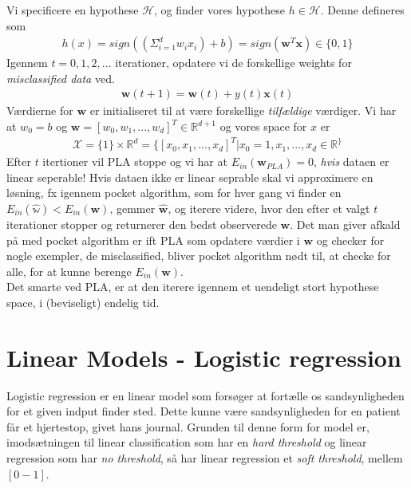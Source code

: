 \documentclass[paper=a4, fontsize=11pt]{scrartcl} %
\numberwithin{equation}{section} %
\numberwithin{figure}{section} %
\numberwithin{table}{section} %
\begin{document}
	Vi specificere en hypothese $\mathcal{H}$, og finder vores hypothese $h\in\mathcal{H}$. Denne defineres som
	\begin{align*}
	h(x)=sign\left(\left(\Sigma_{i=1}^d w_ix_i\right)+b\right)=sign(\mathbf{w}^T\mathbf{x})\in\{0,1\}
	\end{align*}
	Igennem $t=0,1,2,...$ iterationer, opdatere vi de forskellige weights for \textit{misclassified data} ved.
	\begin{align*}
	\mathbf{w}(t+1)=\mathbf{w}(t)+y(t)\mathbf{x}(t)
	\end{align*}
	Værdierne for $\mathbf{w}$ er initialiseret til at være forskellige \textit{tilfældige} værdiger. Vi har at $w_0=b$ og $\mathbf{w}=[w_0,w_1,...,w_d]^T\in\mathbb{R}^{d+1}$ og vores space for $x$ er
	\begin{align*}
	\mathcal{X}=\{1\}\times\mathbb{R}^d=\{[x_0,x_1,...,x_d]^T|x_0=1,x_1,...,x_d\in\mathbb{R}^\} 
	\end{align*} 
	Efter $t$ itertioner vil PLA stoppe og vi har at $E_{in}(\mathbf{w}_{PLA})=0$, \textit{hvis} dataen er linear seperable! Hvis dataen ikke er linear seprable skal vi approximere en løsning, fx igennem pocket algorithm, som for hver gang vi finder en$E_{in}(\hat{\mathbb{w}})<E_{in}(\mathbf{w})$, gemmer $\hat{\mathbf{w}}$, og iterere videre, hvor den efter et valgt $t$ iterationer stopper og returnerer den bedst observerede $\mathbf{w}$. Det man giver afkald på med pocket algorithm er ift PLA som opdatere værdier i $\mathbf{w}$ og checker for nogle exempler, de misclassified, bliver pocket algorithm nødt til, at checke for alle, for at kunne berenge $E_{in}(\mathbf{w})$. \\
	
	Det smarte ved PLA, er at den iterere igennem et uendeligt stort hypothese space, i (beviseligt) endelig tid. 
	
	\newpage
	
	\section*{Linear Models - Logistic regression}
	
	Logistic regression er en linear model som forsøger at fortælle os sandsynligheden for et given indput finder sted. Dette kunne være sandsynligheden for en patient får et hjertestop, givet hans journal. Grunden til denne form for model er, imodsætningen til linear classification som har en \textit{hard threshold} og linear regression som har \textit{no threshold}, så har linear regression et \textit{soft threshold}, mellem $[0-1]$. \\
	
\end{document}
